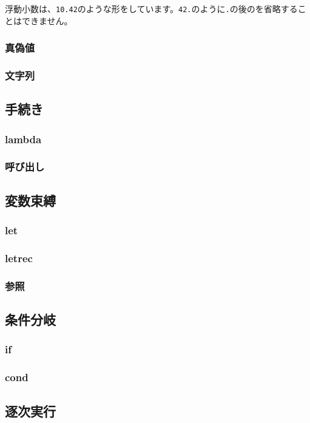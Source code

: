 \documentclass{article}
\begin{document}
浮動小数は、\verb!10.42!のような形をしています。\verb!42.!のように\verb!.!の後のを省略することはできません。

\subsubsection{真偽値}



\subsubsection{文字列}

\subsection{手続き}
\subsubsection{lambda}
\subsubsection{呼び出し}

\subsection{変数束縛}
\subsubsection{let}
\subsubsection{letrec}
\subsubsection{参照}

\subsection{条件分岐}
\subsubsection{if}
\subsubsection{cond}

\subsection{逐次実行}
\end{document}
